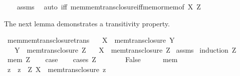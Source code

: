 \begin{isabellebody}
%
\isadelimproof
\ \ %
\endisadelimproof
%
\isatagproof
{}\isamarkupfalse%
\ assms\ \isamarkupfalse%
\ {\isacharparenleft}{\kern0pt}auto\ iff{\isacharcolon}{\kern0pt}\ mem{\isacharunderscore}{\kern0pt}mem{\isacharunderscore}{\kern0pt}trans{\isacharunderscore}{\kern0pt}closure{\isacharunderscore}{\kern0pt}iff{\isacharunderscore}{\kern0pt}mem{\isacharunderscore}{\kern0pt}or{\isacharunderscore}{\kern0pt}mem{\isacharbrackleft}{\kern0pt}of\ X\ Z{\isacharbrackright}{\kern0pt}{\isacharparenright}{\kern0pt}%
\endisatagproof
{\isafoldproof}%
%
\isadelimproof
%
\endisadelimproof
%
\begin{isamarkuptext}%
The next lemma demonstrates a transitivity property.%
\end{isamarkuptext}\isamarkuptrue%
\isamarkupfalse%
\ mem{\isacharunderscore}{\kern0pt}mem{\isacharunderscore}{\kern0pt}trans{\isacharunderscore}{\kern0pt}closure{\isacharunderscore}{\kern0pt}trans{\isacharcolon}{\kern0pt}\isanewline
\ \ \ {\isachardoublequoteopen}X\ {\isasymin}\ mem{\isacharunderscore}{\kern0pt}trans{\isacharunderscore}{\kern0pt}closure\ Y{\isachardoublequoteclose}\isanewline
\ \ \ {\isachardoublequoteopen}Y\ {\isasymin}\ mem{\isacharunderscore}{\kern0pt}trans{\isacharunderscore}{\kern0pt}closure\ Z{\isachardoublequoteclose}\isanewline
\ \ \ {\isachardoublequoteopen}X\ {\isasymin}\ mem{\isacharunderscore}{\kern0pt}trans{\isacharunderscore}{\kern0pt}closure\ Z{\isachardoublequoteclose}\isanewline
%
\isadelimproof
%
\endisadelimproof
%
\isatagproof
{}\isamarkupfalse%
\ assms\isanewline
{}\isamarkupfalse%
\ {\isacharparenleft}{\kern0pt}induction\ Z{\isacharparenright}{\kern0pt}\isanewline
\ \ \isamarkupfalse%
\ {\isacharparenleft}{\kern0pt}mem\ Z{\isacharparenright}{\kern0pt}\isanewline
\ \ \isamarkupfalse%
\ {\isacharquery}{\kern0pt}case\isanewline
\ \ \isamarkupfalse%
\ {\isacharparenleft}{\kern0pt}cases\ {\isachardoublequoteopen}Z\ {\isacharequal}{\kern0pt}\ {\isacharbraceleft}{\kern0pt}{\isacharbraceright}{\kern0pt}{\isachardoublequoteclose}{\isacharparenright}{\kern0pt}\isanewline
\ \ \ \ \isamarkupfalse%
\ False\isanewline
\ \ \ \ \isamarkupfalse%
\ mem\ \isamarkupfalse%
\ z\ \ {\isachardoublequoteopen}z\ {\isasymin}\ Z{\isachardoublequoteclose}\ {\isachardoublequoteopen}X\ {\isasymin}\ mem{\isacharunderscore}{\kern0pt}trans{\isacharunderscore}{\kern0pt}closure\ z{\isachardoublequoteclose}\ \isamarkupfalse%

\end{isabellebody}
